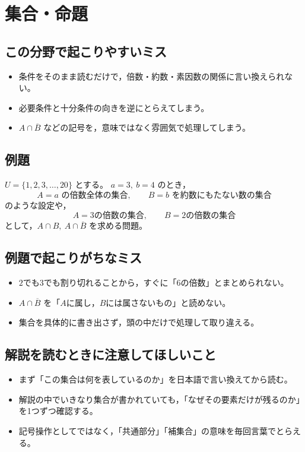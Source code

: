 \section*{集合・命題}

\subsection*{この分野で起こりやすいミス}
\begin{itemize}
  \item 条件をそのまま読むだけで，倍数・約数・素因数の関係に言い換えられない。
  \item 必要条件と十分条件の向きを逆にとらえてしまう。
  \item $A\cap \overline{B}$ などの記号を，意味ではなく雰囲気で処理してしまう。
\end{itemize}

\subsection*{例題}
$U=\{1,2,3,\dots,20\}$ とする。  
$a=3,\ b=4$ のとき，
\[
A=\text{$a$ の倍数全体の集合},\qquad B=\text{$b$ を約数にもたない数の集合}
\]
のような設定や，
\[
A=\text{3の倍数の集合},\qquad B=\text{2の倍数の集合}
\]
として，$A\cap B,\ A\cap \overline{B}$ を求める問題。

\subsection*{例題で起こりがちなミス}
\begin{itemize}
  \item $2$でも$3$でも割り切れることから，すぐに「$6$の倍数」とまとめられない。
  \item $A\cap \overline{B}$ を「$A$に属し，$B$には属さないもの」と読めない。
  \item 集合を具体的に書き出さず，頭の中だけで処理して取り違える。
\end{itemize}

\subsection*{解説を読むときに注意してほしいこと}
\begin{itemize}
  \item まず「この集合は何を表しているのか」を日本語で言い換えてから読む。
  \item 解説の中でいきなり集合が書かれていても，「なぜその要素だけが残るのか」を1つずつ確認する。
  \item 記号操作としてではなく，「共通部分」「補集合」の意味を毎回言葉でとらえる。
\end{itemize}

